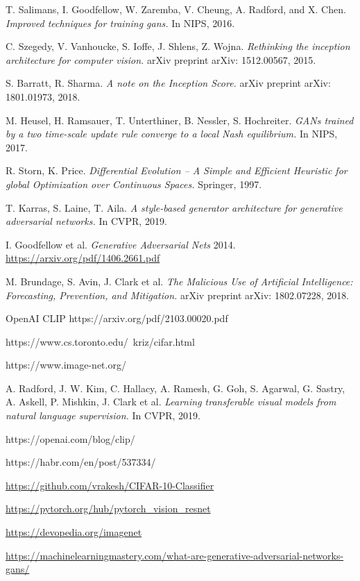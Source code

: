 \documentclass[12pt,a4paper,openany]{book}
\begin{document}
\begin{thebibliography}{a,b,c}
 T. Salimans, I. Goodfellow, W. Zaremba, V. Cheung, A. Radford, and X. Chen. {\it Improved techniques for training gans.} In NIPS, 2016.

 C. Szegedy, V. Vanhoucke, S. Ioffe, J. Shlens, Z. Wojna. {\it Rethinking the inception architecture for computer vision.} arXiv preprint arXiv: 1512.00567, 2015.

 S. Barratt, R. Sharma. {\it A note on the Inception Score.} arXiv preprint arXiv: 1801.01973, 2018.

 M. Heusel, H. Ramsauer, T. Unterthiner, B. Nessler, S. Hochreiter. {\it GANs trained by a two time-scale update rule converge to a local Nash equilibrium.} In NIPS, 2017.

 R. Storn, K. Price. {\it Differential Evolution – A Simple and Efficient Heuristic for global Optimization over Continuous Spaces.} Springer, 1997.

 T. Karras, S. Laine, T. Aila. {\it A style-based generator architecture for generative adversarial networks.} In CVPR, 2019.

 I. Goodfellow et al.  {\it Generative Adversarial Nets} 2014.  \url{https://arxiv.org/pdf/1406.2661.pdf}

 M. Brundage, S. Avin, J. Clark et al. {\it The Malicious Use of Artificial Intelligence: Forecasting, Prevention, and Mitigation.} arXiv preprint arXiv: 1802.07228, 2018.

 OpenAI CLIP https://arxiv.org/pdf/2103.00020.pdf

 https://www.cs.toronto.edu/~kriz/cifar.html

 https://www.image-net.org/

 A. Radford, J. W. Kim, C. Hallacy, A. Ramesh, G. Goh, S. Agarwal, G. Sastry, A. Askell, P. Mishkin, J. Clark et al. {\it Learning transferable visual models
from natural language supervision.} In CVPR, 2019.

 https://openai.com/blog/clip/

 https://habr.com/en/post/537334/

 \url{https://github.com/vrakesh/CIFAR-10-Classifier}

 \url{https://pytorch.org/hub/pytorch_vision_resnet}

 \url{https://devopedia.org/imagenet}

 \url{https://machinelearningmastery.com/what-are-generative-adversarial-networks-gans/}
%
%


\end{thebibliography}
\end{document}
